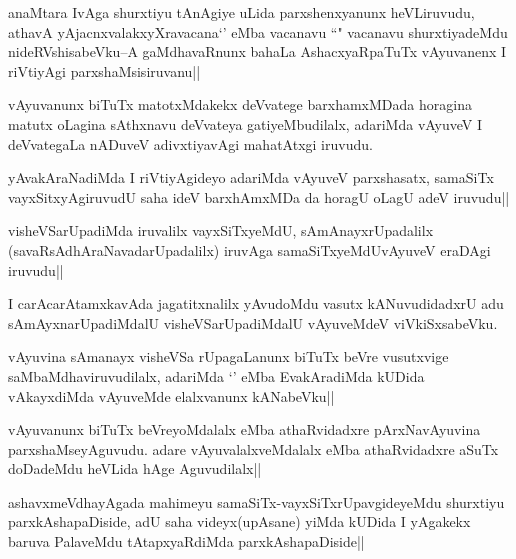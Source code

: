 \begin{artha}
anaMtara IvAga shurxtiyu tAnAgiye uLida parxshenxyanunx heVLiruvudu, athavA yAjacnxvalakxyXravacana`\stext' eMba vacanavu ``\stext" vacanavu shurxtiyadeMdu nideRVshisabeVku--A gaMdhavaRnunx bahaLa AshacxyaRpaTuTx vAyuvanenx I riVtiyAgi parxshaMsisiruvanu||
\end{artha}


\begin{artha}
vAyuvanunx biTuTx matotxMdakekx deVvatege barxhamxMDada horagina matutx oLagina sAthxnavu deVvateya gatiyeMbudilalx, adariMda vAyuveV I deVvategaLa nADuveV adivxtiyavAgi mahatAtxgi iruvudu.
\end{artha}

\begin{artha}
yAvakAraNadiMda I riVtiyAgideyo adariMda vAyuveV parxshasatx, samaSiTx vayxSitxyAgiruvudU saha ideV barxhAmxMDa da horagU oLagU adeV iruvudu||
\end{artha}

\begin{artha}
visheVSarUpadiMda iruvalilx vayxSiTxyeMdU, sAmAnayxrUpadalilx (savaRsAdhAraNavadarUpadalilx) iruvAga samaSiTxyeMdUvAyuveV eraDAgi iruvudu||
\end{artha}

\begin{artha}
I carAcarAtamxkavAda jagatitxnalilx yAvudoMdu vasutx kANuvudidadxrU adu sAmAyxnarUpadiMdalU visheVSarUpadiMdalU vAyuveMdeV viVkiSxsabeVku.
\end{artha}

\begin{artha}
vAyuvina sAmanayx visheVSa rUpagaLanunx biTuTx beVre vusutxvige saMbaMdhaviruvudilalx, adariMda `\stext' eMba EvakAradiMda kUDida vAkayxdiMda vAyuveMde elalxvanunx kANabeVku||
\end{artha}


\begin{artha}
vAyuvanunx biTuTx beVreyoMdalalx eMba athaRvidadxre pArxNavAyuvina parxshaMseyAguvudu. adare vAyuvalalxveMdalalx eMba athaRvidadxre aSuTx doDadeMdu heVLida hAge Aguvudilalx||
\end{artha}

\begin{artha}
ashavxmeVdhayAgada mahimeyu samaSiTx-vayxSiTxrUpavgideyeMdu shurxtiyu parxkAshapaDiside, adU saha videyx(upAsane) yiMda kUDida I yAgakekx baruva PalaveMdu tAtapxyaRdiMda parxkAshapaDiside||
\end{artha}

